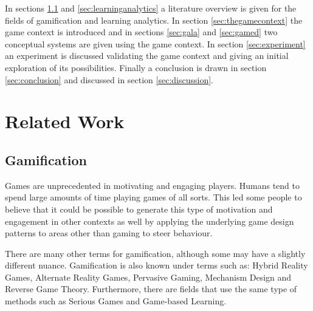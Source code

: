 \documentclass[11pt]{article}
\begin{document}









In sections \ref{sec:gamification} and \ref{sec:learninganalytics} a literature overview is given for the fields of gamification and learning analytics. In section \ref{sec:thegamecontext} the game context is introduced and in sections \ref{sec:gala} and \ref{sec:gamed} two conceptual systems are given using the game context. In section \ref{sec:experiment} an experiment is discussed validating the game context and giving an initial exploration of its possibilities. Finally a conclusion is drawn in section \ref{sec:conclusion} and discussed in section \ref{sec:discussion}.

\section{Related Work}
\subsection{Gamification}\label{sec:gamification}
Games are unprecedented in motivating and engaging players. Humans tend to spend large amounts of time playing games of all sorts. This led some people to believe that it could be possible to generate this type of motivation and engagement in other contexts as well by applying the underlying game design patterns to areas other than gaming to steer behaviour.

There are many other terms for gamification, although some may have a slightly different nuance. Gamification is also known under terms such as: Hybrid Reality Games, Alternate Reality Games, Pervasive Gaming, Mechanism Design and Reverse Game Theory. Furthermore, there are fields that use the same type of methods such as Serious Games and Game-based Learning.
\end{document}
